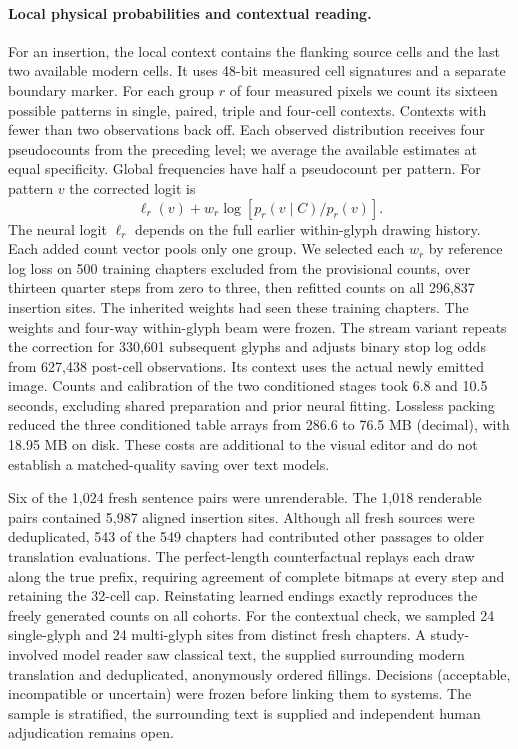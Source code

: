 \documentclass[12pt,a4paper]{article}
\providecommand{\DIFadd}[1]{{\protect\color{blue} \sf #1}} %
\begin{document}
\paragraph{\DIFadd{Local physical probabilities and contextual reading.}}
\DIFadd{For an insertion, the local context contains the flanking source cells and the last two available modern cells. It uses 48-bit measured cell signatures and a separate boundary marker. For each group $r$ of four measured pixels we count its sixteen possible patterns in single, paired, triple and four-cell contexts. Contexts with fewer than two observations back off. Each observed distribution receives four pseudocounts from the preceding level; we average the available estimates at equal specificity. Global frequencies have half a pseudocount per pattern. For pattern $v$ the corrected logit is
}\[
  \ell_r(v) + w_r\log\!\left[p_r(v\mid C)/p_r(v)\right].
\]
\DIFadd{The neural logit $\ell_r$ depends on the full earlier within-glyph drawing history. Each added count vector pools only one group. We selected each $w_r$ by reference log loss on 500 training chapters excluded from the provisional counts, over thirteen quarter steps from zero to three, then refitted counts on all 296,837 insertion sites. The inherited weights had seen these training chapters. The weights and four-way within-glyph beam were frozen. The stream variant repeats the correction for 330,601 subsequent glyphs and adjusts binary stop log odds from 627,438 post-cell observations. Its context uses the actual newly emitted image. Counts and calibration of the two conditioned stages took 6.8 and 10.5 seconds, excluding shared preparation and prior neural fitting. Lossless packing reduced the three conditioned table arrays from 286.6 to 76.5 MB (decimal), with 18.95 MB on disk. These costs are additional to the visual editor and do not establish a matched-quality saving over text models.
}

\DIFadd{Six of the 1,024 fresh sentence pairs were unrenderable. The 1,018 renderable pairs contained 5,987 aligned insertion sites. Although all fresh sources were deduplicated, 543 of the 549 chapters had contributed other passages to older translation evaluations. The perfect-length counterfactual replays each draw along the true prefix, requiring agreement of complete bitmaps at every step and retaining the 32-cell cap. Reinstating learned endings exactly reproduces the freely generated counts on all cohorts. For the contextual check, we sampled 24 single-glyph and 24 multi-glyph sites from distinct fresh chapters. A study-involved model reader saw classical text, the supplied surrounding modern translation and deduplicated, anonymously ordered fillings. Decisions (acceptable, incompatible or uncertain) were frozen before linking them to systems. The sample is stratified, the surrounding text is supplied and independent human adjudication remains open.
}
\end{document}
